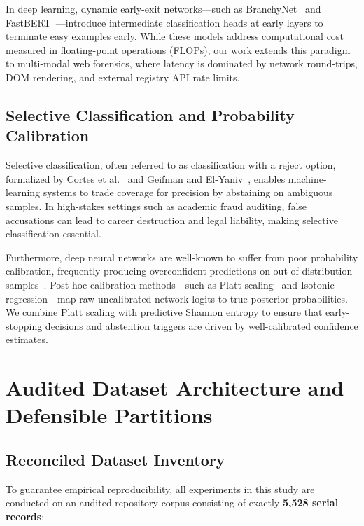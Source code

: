 \documentclass[journal]{IEEEtran}
\begin{document}
In deep learning, dynamic early-exit networks---such as BranchyNet~\cite{teerapittayanon2016branchynet} and FastBERT~\cite{liu2020fastbert}---introduce intermediate classification heads at early layers to terminate easy examples early. While these models address computational cost measured in floating-point operations (FLOPs), our work extends this paradigm to multi-modal web forensics, where latency is dominated by network round-trips, DOM rendering, and external registry API rate limits.

\subsection{Selective Classification and Probability Calibration}
Selective classification, often referred to as classification with a reject option, formalized by Cortes et al.~\cite{cortes2016learning} and Geifman and El-Yaniv~\cite{geifman2017selective}, enables machine-learning systems to trade coverage for precision by abstaining on ambiguous samples. In high-stakes settings such as academic fraud auditing, false accusations can lead to career destruction and legal liability, making selective classification essential.

Furthermore, deep neural networks are well-known to suffer from poor probability calibration, frequently producing overconfident predictions on out-of-distribution samples~\cite{guo2017calibration}. Post-hoc calibration methods---such as Platt scaling~\cite{platt1999probabilistic} and Isotonic regression---map raw uncalibrated network logits to true posterior probabilities. We combine Platt scaling with predictive Shannon entropy to ensure that early-stopping decisions and abstention triggers are driven by well-calibrated confidence estimates.

\section{Audited Dataset Architecture and Defensible Partitions}

\subsection{Reconciled Dataset Inventory}
To guarantee empirical reproducibility, all experiments in this study are conducted on an audited repository corpus consisting of exactly \textbf{5,528 serial records}:
\end{document}
